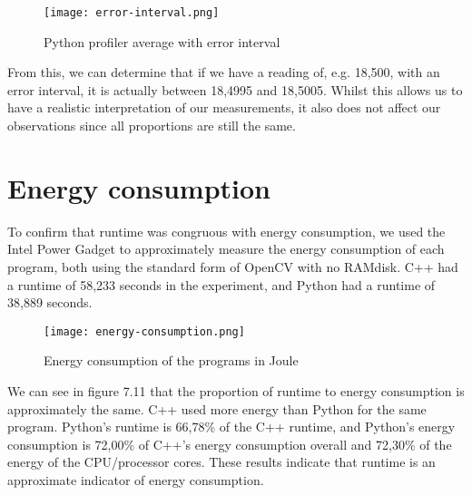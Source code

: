 \begin{figure}[H]
	\centering
	\texttt{[image: error-interval.png]}
	\caption{Python profiler average with error interval}
	\label{figure:error-interval}
\end{figure}

From this, we can determine that if we have a reading of, e.g. 18,500, with an error interval, it is actually between 18,4995 and 18,5005. Whilst this allows us to have a realistic interpretation of our measurements, it also does not affect our observations since all proportions are still the same.

\section{Energy consumption}
To confirm that runtime was congruous with energy consumption, we used the Intel Power Gadget to approximately measure the energy consumption of each program, both using the standard form of OpenCV with no RAMdisk. C++ had a runtime of 58,233 seconds in the experiment, and Python had a runtime of 38,889 seconds.

\begin{figure}[H]
	\centering
	\texttt{[image: energy-consumption.png]}
	\caption{Energy consumption of the programs in Joule}
	\label{figure:energy-consumption}
\end{figure}

We can see in figure 7.11 that the proportion of runtime to energy consumption is approximately the same. C++ used more energy than Python for the same program. Python’s runtime is 66,78\% of the C++ runtime, and Python’s energy consumption is 72,00\% of C++’s energy consumption overall and 72,30\% of the energy of the CPU/processor cores. These results indicate that runtime is an approximate indicator of energy consumption.
